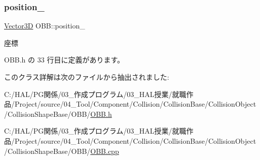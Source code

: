 \subsubsection{\texorpdfstring{position\+\_\+}{position\_}}
{\footnotesize\ttfamily \mbox{\hyperlink{class_vector3_d}{Vector3D}} O\+B\+B\+::position\+\_\+\hspace{0.3cm}{\ttfamily [private]}}



座標 



 O\+B\+B.\+h の 33 行目に定義があります。



このクラス詳解は次のファイルから抽出されました\+:\begin{DoxyCompactItemize}
\item 
C\+:/\+H\+A\+L/\+P\+G関係/03\+\_\+作成プログラム/03\+\_\+\+H\+A\+L授業/就職作品/\+Project/source/04\+\_\+\+Tool/\+Component/\+Collision/\+Collision\+Base/\+Collision\+Object/\+Collision\+Shape\+Base/\+O\+B\+B/\mbox{\hyperlink{_o_b_b_8h}{O\+B\+B.\+h}}\item 
C\+:/\+H\+A\+L/\+P\+G関係/03\+\_\+作成プログラム/03\+\_\+\+H\+A\+L授業/就職作品/\+Project/source/04\+\_\+\+Tool/\+Component/\+Collision/\+Collision\+Base/\+Collision\+Object/\+Collision\+Shape\+Base/\+O\+B\+B/\mbox{\hyperlink{_o_b_b_8cpp}{O\+B\+B.\+cpp}}\end{DoxyCompactItemize}

